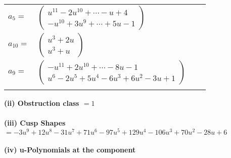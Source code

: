 \documentclass[1p]{elsarticle_modified}
\theoremstyle{definition}
\begin{document}
\begin{tabular}{m{7pt} m{180pt} m{7pt} m{180pt} }
\flushright $a_{5}=$&$\begin{pmatrix}u^{11}-2 u^{10}+\cdots- u+4\\- u^{10}+3 u^9+\cdots+5 u-1\end{pmatrix}$ \\
\flushright $a_{10}=$&$\begin{pmatrix}u^3+2 u\\u^3+u\end{pmatrix}$ \\
\flushright $a_{9}=$&$\begin{pmatrix}- u^{11}+2 u^{10}+\cdots-8 u-1\\u^6-2 u^5+5 u^4-6 u^3+6 u^2-3 u+1\end{pmatrix}$\\&\end{tabular}
\flushleft \textbf{(ii) Obstruction class $= 1$}\\~\\
\flushleft \textbf{(iii) Cusp Shapes $= -3 u^9+12 u^8-31 u^7+71 u^6-97 u^5+129 u^4-106 u^3+70 u^2-28 u+6$}\\~\\
\newpage\renewcommand{\arraystretch}{1}
\flushleft \textbf{(iv) u-Polynomials at the component}\newline \\
\end{document}
